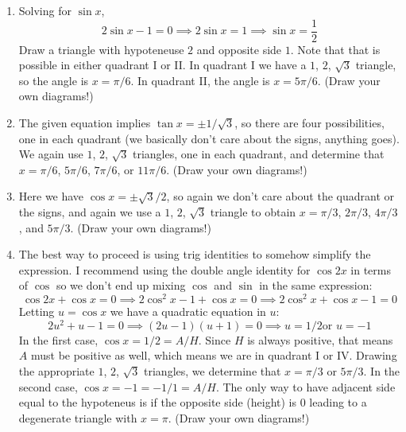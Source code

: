 \documentclass{article}
\newcommand{\ds}{\displaystyle}
\begin{document}
\begin{enumerate}
\begin{enumerate}
  \item %
    Solving for $\sin x$,
    \begin{equation*}
      2\sin x -1 = 0 \implies 2\sin x = 1 \implies \sin x =
      \frac{1}{2}
    \end{equation*}
    Draw a triangle with hypoteneuse $2$ and opposite side $1$.  Note
    that that is possible in either quadrant I or II.  In quadrant I
    we have a $1$, $2$, $\sqrt{3}$ triangle, so the angle is $x=\pi/6$.
    In quadrant II, the angle is $x=5\pi/6$.
    (Draw your own diagrams!)
  \item %
    The given equation implies $\tan x = \pm 1/\sqrt{3}$, so there are four
    possibilities, one in each quadrant (we basically don't care about
    the signs, anything goes).  We again use $1$, $2$, $\sqrt{3}$
    triangles, one in each quadrant, and determine that $x=\pi/6$,
    $5\pi/6$, $7\pi/6$, or $11\pi/6$.  (Draw your own diagrams!)
  \item %
    Here we have $\cos x = \pm \sqrt{3}/2$, so again we don't care
    about the quadrant or the signs, and again we use a $1$, $2$,
    $\sqrt{3}$ triangle to obtain $x=\pi/3$, $2\pi/3$, $4\pi/3$, and
    $5\pi/3$.   (Draw your own diagrams!)
  \item %
    The best way to proceed is using trig identities to somehow
    simplify the expression.  I recommend using the double angle
    identity for $\cos 2x$ in terms of $\cos$ so we don't end up
    mixing $\cos$ and $\sin$ in the same expression:
    \begin{equation*}
      \cos 2x + \cos x = 0 \implies 2\cos^2 x - 1 + \cos x = 0
      \implies 
      2\cos^2 x + \cos x - 1 = 0
    \end{equation*}
    Letting $u=\cos x$ we have a quadratic equation in $u$:
    \begin{equation*}
      2u^2 + u - 1 = 0 \implies (2u-1)(u+1) = 0 \implies \mbox{$u=1/2$
        or $u=-1$}
    \end{equation*}
    In the first case, $\cos x = 1/2 = A/H$.  Since $H$ is always
    positive, that means $A$ must be positive as well, which means we
    are in quadrant I or IV.  Drawing the appropriate $1$, $2$,
    $\sqrt{3}$ triangles, we determine that $x=\pi/3$ or $5\pi/3$.  In
    the second case, $\cos x = -1 = -1/1 = A/H$.  The only way to have
    adjacent side equal to the hypoteneus is if the opposite side
    (height) is $0$ leading to a degenerate triangle with $x=\pi$.
    (Draw your own diagrams!)  %
    

\end{enumerate}
\end{enumerate}
\end{document}
